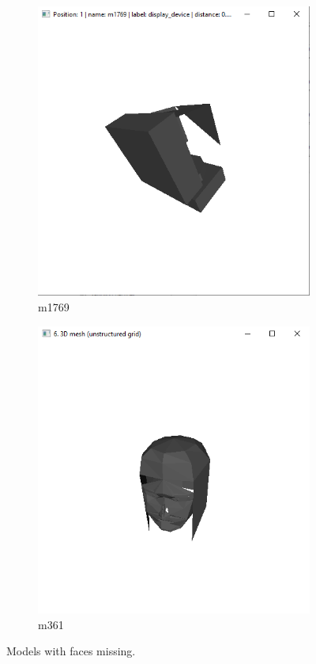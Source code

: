 \documentclass{bigdata}
\begin{document}
\begin{figure}[h!]
	\centering
	\begin{subfigure}[b]{0.4\linewidth}
		\includegraphics[width=\linewidth]{Pictures/problem1.png}
		\caption{m1769}
	\end{subfigure}
	\begin{subfigure}[b]{0.4\linewidth}
		\includegraphics[width=\linewidth]{Pictures/problem2.png}
		\caption{m361}
	\end{subfigure}
	\caption{Models with faces missing.}
	\label{fig:problems}
\end{figure}
\end{document}
